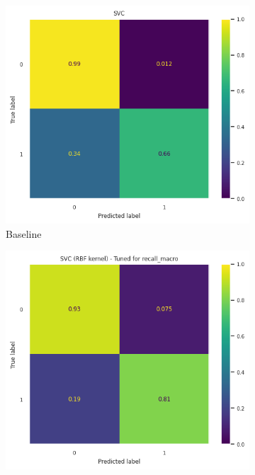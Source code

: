 \begin{frame}{\subsecname}
\begin{figure}
    \centering
    \begin{subfigure}[c]{0.32\textwidth}
        \includegraphics[width=\textwidth]{images/models/SVM_base.png}
        \caption{Baseline}
    \end{subfigure}
    \begin{subfigure}[c]{0.32\textwidth}
        \includegraphics[width=\textwidth]{images/models/SVM_tuned_rbf.png}

\end{subfigure}
\end{figure}
\end{frame}
